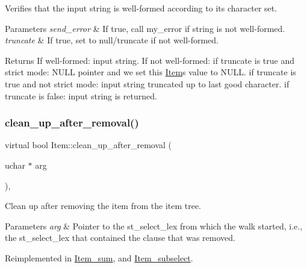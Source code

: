 Verifies that the input string is well-\/formed according to its character set. 
\begin{DoxyParams}{Parameters}
{\em send\+\_\+error} & If true, call my\+\_\+error if string is not well-\/formed. \\
\hline
{\em truncate} & If true, set to null/truncate if not well-\/formed.\\
\hline
\end{DoxyParams}
\begin{DoxyReturn}{Returns}
If well-\/formed\+: input string. If not well-\/formed\+: if truncate is true and strict mode\+: N\+U\+LL pointer and we set this \mbox{\hyperlink{classItem}{Item}}\textquotesingle{}s value to N\+U\+LL. if truncate is true and not strict mode\+: input string truncated up to last good character. if truncate is false\+: input string is returned. 
\end{DoxyReturn}
\mbox{\label{classItem_a649bf72a4ae639e262d147cf5beaa30a}} 
\subsubsection{\texorpdfstring{clean\+\_\+up\+\_\+after\+\_\+removal()}{clean\_up\_after\_removal()}}
{\footnotesize\ttfamily virtual bool Item\+::clean\+\_\+up\+\_\+after\+\_\+removal (\begin{DoxyParamCaption}\item[{uchar $\ast$}]{arg }\end{DoxyParamCaption})\hspace{0.3cm}{\ttfamily [inline]}, {\ttfamily [virtual]}}

Clean up after removing the item from the item tree.


\begin{DoxyParams}{Parameters}
{\em arg} & Pointer to the st\+\_\+select\+\_\+lex from which the walk started, i.\+e., the st\+\_\+select\+\_\+lex that contained the clause that was removed. \\
\hline
\end{DoxyParams}


Reimplemented in \mbox{\hyperlink{classItem__sum_a838d698110f5c45d6ad3ba1c6e5b2a95}{Item\+\_\+sum}}, and \mbox{\hyperlink{classItem__subselect_a0944e9b89787f5adac23639eb0792d86}{Item\+\_\+subselect}}.

